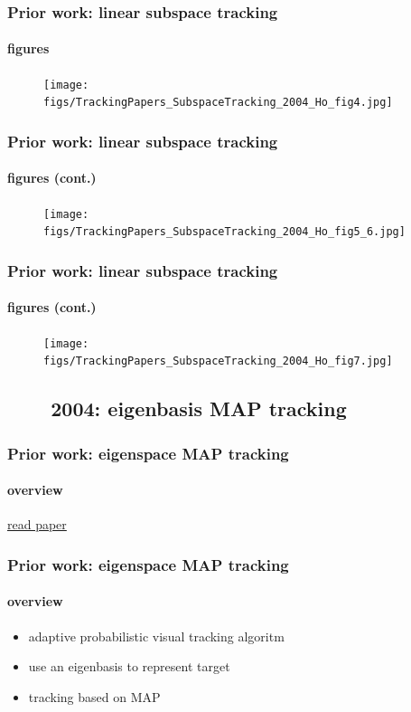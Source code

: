 \begin{frame}
\frametitle{Prior work: linear subspace tracking}
\framesubtitle{figures}
\logoCSIPCPL\mypagenum
	\begin{figure}
		\texttt{[image: figs/TrackingPapers\_SubspaceTracking\_2004\_Ho\_fig4.jpg]}
	\end{figure}
\end{frame}



\begin{frame}
\frametitle{Prior work: linear subspace tracking}
\framesubtitle{figures (cont.)}
\logoCSIPCPL\mypagenum
	\begin{figure}
		\texttt{[image: figs/TrackingPapers\_SubspaceTracking\_2004\_Ho\_fig5\_6.jpg]}
	\end{figure}
\end{frame}


\begin{frame}
\frametitle{Prior work: linear subspace tracking}
\framesubtitle{figures (cont.)}
\logoCSIPCPL\mypagenum
	\begin{figure}
		\texttt{[image: figs/TrackingPapers\_SubspaceTracking\_2004\_Ho\_fig7.jpg]}
	\end{figure}
\end{frame}

\subsection{\ \ \ \ 2004: eigenbasis MAP tracking}
\begin{frame}
\frametitle{Prior work: eigenspace MAP tracking}
\framesubtitle{overview}
\logoCSIPCPL\mypagenum
	{\color{blue}  \href{http://users.ece.gatech.edu/~msalman/papers/2004 CNF, Adaptive probabilistic visual tracking with incremental subspace (Ross).pdf}{read paper}}
\end{frame}



\begin{frame}
\frametitle{Prior work: eigenspace MAP tracking}
\framesubtitle{overview}
\logoCSIPCPL\mypagenum
	\begin{itemize}
		\item adaptive probabilistic visual tracking algoritm
		\item use an eigenbasis to represent target
		\item tracking based on MAP
	\end{itemize}
\end{frame}


